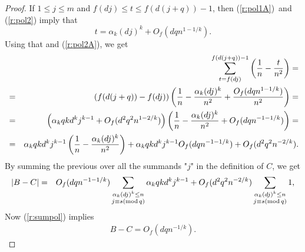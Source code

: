 \documentclass{amsart}
\numberwithin {equation}{section}
\begin{document}
\begin{proof}
If $1\leq j\leq m$ and $f(dj)\leq t\leq f(d(j+q))-1$, then (\ref{r:pol1A})\
and (\ref{r:pol2}) imply that 
\begin{equation*}
t=\alpha _{k}(dj)^{k}+O_{f}(dqn^{1-1/k}){\text {.}}
\end{equation*}
Using that and (\ref{r:pol2A}), we get 
\begin{eqnarray}
&&\sum _{t=f(dj)}^{f(d(j+q))-1}\left (\frac{1}{n}-\frac{t}{n^{2}}\right )= 
\notag \\
&=&(f(d(j+q))-f(dj))\left (\frac{1}{n}-\frac{\alpha _{k}(dj)^{k}}{n^{2}}+\frac{O_{f}(dqn^{1-1/k})}{n^{2}}\right )=  \notag \\
&=&\left (\alpha _{k}qkd^{k}j^{k-1}+O_{f}(d^{2}q^{2}n^{1-2/k})\right )\left (\frac{1}{n}-\frac{\alpha _{k}(dj)^{k}}{n^{2}}+O_{f}(dqn^{-1-1/k})\right )= 
\notag \\
&=&\alpha _{k}qkd^{k}j^{k-1}\left (\frac{1}{n}-\frac{\alpha _{k}(dj)^{k}}{n^{2}}\right )+\alpha
_{k}qkd^{k}j^{k-1}O_{f}(dqn^{-1-1/k})+O_{f}(d^{2}q^{2}n^{-2/k}){\text {.}} 
\notag
\end{eqnarray}
By summing the previous over all the summands "$j$" in the definition of $C$, we get 
\begin{eqnarray}
|B-C|&=&O_{f}(dqn^{-1-1/k})\sum _{\substack{ \alpha _{k}(dj)^{k}\leq n  \\ j\equiv s({\mathrm{mod}}\,q)}}\alpha
_{k}qkd^{k}j^{k-1}+O_{f}(d^{2}q^{2}n^{-2/k})\sum _{\substack{ \alpha
_{k}(dj)^{k}\leq n  \\ j\equiv s({\mathrm{mod}}\,q)}}1,  \notag
\end{eqnarray}
Now (\ref{r:sumpol}) implies 
\begin{eqnarray}
B-C=O_{f}(dqn^{-1/k}){\text {.}}  \label{r:BBCC}
\end{eqnarray}


\end{proof}
\end{document}
